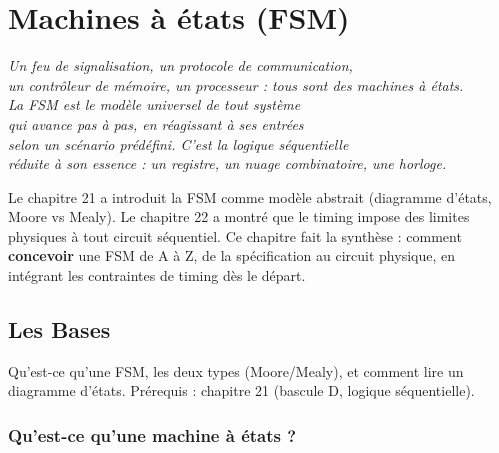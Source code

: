 \documentclass[12pt,a4paper,twoside]{book}
\begin{document}

\chapter{Machines à états (FSM)}

\begin{center}
\textit{Un feu de signalisation, un protocole de communication,\\
un contrôleur de mémoire, un processeur : tous sont des machines à états.\\
La FSM est le modèle universel de tout système\\
qui avance pas à pas, en réagissant à ses entrées\\
selon un scénario prédéfini. C'est la logique séquentielle\\
réduite à son essence : un registre, un nuage combinatoire, une horloge.}
\end{center}

\vspace{0.5cm}

Le chapitre 21 a introduit la FSM comme modèle abstrait (diagramme d'états, Moore vs Mealy). Le chapitre 22 a montré que le timing impose des limites physiques à tout circuit séquentiel. Ce chapitre fait la synthèse : comment \textbf{concevoir} une FSM de A à Z, de la spécification au circuit physique, en intégrant les contraintes de timing dès le départ.

\section{Les Bases}

\begin{bases}
Qu'est-ce qu'une FSM, les deux types (Moore/Mealy), et comment lire un diagramme d'états. Prérequis : chapitre 21 (bascule D, logique séquentielle).
\end{bases}

\subsection{Qu'est-ce qu'une machine à états ?}
\end{document}
